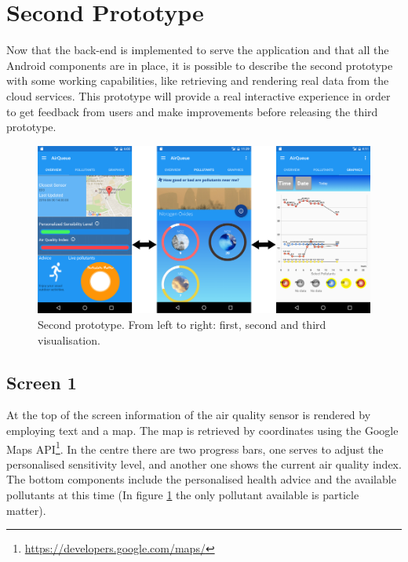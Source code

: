 \section{Second Prototype}
Now that the back-end is implemented to serve the application and that all the Android components are in place, it is possible to describe the second prototype with some working capabilities, like retrieving and rendering real data from the cloud services. This prototype will provide a real interactive experience in order to get feedback from users and make improvements before releasing the third prototype. 

\begin{figure}[H]
\begin{adjustbox}{width=1.2\textwidth,center=\textwidth}
  \centering
  \includegraphics[scale=1]{images/secondPrototype.png}
\end{adjustbox}
  \caption[Second prototype]{Second prototype. From left to right: first, second and third visualisation.}
  \label{fig:first_second_prototype}
\end{figure}

\subsection{Screen 1}
At the top of the screen information of the air quality sensor is rendered by employing text and a map. The map is retrieved by coordinates using the Google Maps API\footnote{\url{https://developers.google.com/maps/}}. In the centre there are two progress bars, one serves to adjust the personalised sensitivity level, and another one shows the current air quality index. The bottom components include the personalised health advice and the available pollutants at this time (In figure \ref{fig:first_second_prototype} the only pollutant available is particle matter). 

